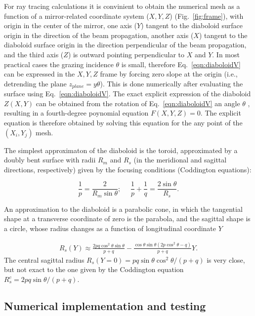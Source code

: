 \documentclass{iucr}              %
\begin{document}
For ray tracing calculations it is convinient to obtain the numerical mesh as a function of a mirror-related coordinate system ($X,Y,Z$) (Fig.~\ref{fig:frame}), with origin in the center of the mirror, one axis ($Y$) tangent to the diaboloid surface origin in the direction of the beam propagation, another axis ($X$) tangent to the diaboloid surface origin in the direction perpendicular of the beam propagation, and the third axis ($Z$) is outward pointing perpendicular to $X$ and $Y$. 
In most practical cases the grazing incidence $\theta$ is small, therefore Eq.~\ref{eqn:diaboloidV} can be expressed in the $X,Y,Z$ frame by forcing zero slope at the origin (i.e., detrending the plane $z_{plane}=y \theta$). This is done numerically after evaluating the surface using Eq.~\ref{eqn:diaboloidV}. 
The exact explicit expression of the diaboloid $Z(X,Y)$ can be obtained from the rotation of Eq.~\ref{eqn:diaboloidV} an angle $\theta$ \cite{part2}, resulting in a fourth-degree poynomial equation $F(X,Y,Z)=0$. The explicit equation is therefore obtained by solving this equation for the any point of the $(X_i,Y_j)$ mesh.

The simplest approximaton of the diaboloid is the toroid, approximated by a doubly bent surface with radii $R_m$ and $R_s$ (in the meridional and sagittal directions, respectively) given by the focusing conditions (Coddington equations):

\begin{equation}
\label{eqn:radii}
\frac{1}{p} = \frac{2 }{R_m \sin\theta };~~~~~~
\frac{1}{p} + \frac{1}{q} = \frac{2\sin\theta}{ R_s}.
\end{equation}

An approximation to the diaboloid is a parabolic cone, in which the tangential shape at a transverse coordinate of zero is the parabola, and the sagittal shape is a circle, whose radius changes as a function of longitudinal coordinate $Y$ \cite{part2}

\begin{multline}
\label{eq:sagRadius}
R_s(Y) 
\approx 
\frac{2p q \cos^2\theta \sin\theta  }{p + q} - 
\frac{\cos\theta \sin\theta (2 p \cos^2\theta - q)}{p + q} Y.
\end{multline}
The central sagittal radius $R_s(Y=0)=p q \sin\theta \cos^2\theta/ (p+q)$ is very close, but not exact to the one given by the Coddington equation $R_s^c=2 p q \sin\theta / (p+q)$.


\subsection{Numerical implementation and testing}
\label{sec:oasys}
\end{document}
